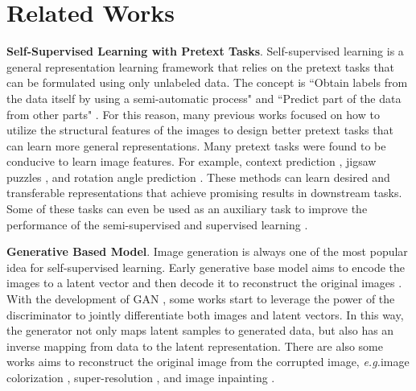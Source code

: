 \documentclass{article}
\newcommand{\<}{\left\langle}
\renewcommand{\>}{\right\rangle}
\newcommand{\eg}{{\emph{e.g.}}}
\begin{document}
 \section{Related Works}
\textbf{Self-Supervised Learning with Pretext Tasks}. Self-supervised learning is a general representation learning framework that relies on the pretext tasks that can be formulated using only unlabeled data. The concept is ``Obtain labels from the data itself by using a semi-automatic process" and ``Predict part of the data from other parts" \cite{ssl_survey}. For this reason, many previous works focused on how to utilize the structural features of the images to design better pretext tasks that can learn more general representations.  Many pretext tasks were found to be conducive to learn image features. For example,  context prediction \cite{contextpred}, jigsaw puzzles \cite{jigsaw}, and rotation angle prediction \cite{rotation}. These methods can learn desired and transferable representations that achieve promising results in downstream tasks. Some of these tasks can even be used as an auxiliary task to improve the performance of the semi-supervised and supervised learning \cite{s4l, rotation_selfsup, SupervisedCL}.


\textbf{Generative Based Model}. Image generation is always one of the most popular idea for self-supervised learning. Early generative base model aims to encode the images to a latent vector and then decode it to reconstruct the original images \cite{autoencoder, vae}. With the development of GAN \cite{gan, bigbigan}, some works \cite{biggan, bigbigan} start to leverage the power of the discriminator to jointly differentiate both images and latent vectors. In this way, the generator not only maps latent samples to generated data, but also has an inverse mapping from data to the latent representation. There are also some works aims to reconstruct the original image from the corrupted image, \eg image colorization \cite{img_color}, super-resolution \cite{srgan}, and image inpainting \cite{inpainting}.
\end{document}
